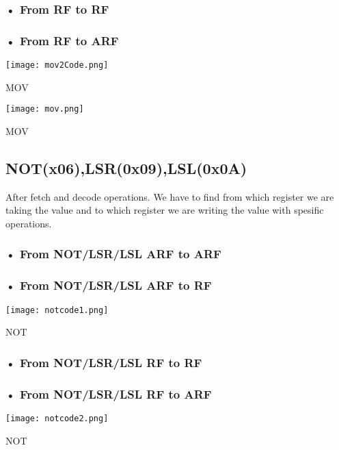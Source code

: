 \documentclass[pdftex,12pt,a4paper]{article}
\begin{document}
\subsubsection{• From RF to RF}
\subsubsection{• From RF to ARF}

\begin{figure21}
	\centering
	\texttt{[image: mov2Code.png]}	
	\caption{MOV}
	\label{fig1}
\end{figure21}

\begin{figure8}
	\centering
	\texttt{[image: mov.png]}	
	\caption{MOV}
	\label{fig1}
\end{figure8}


\subsection{NOT(x06),LSR(0x09),LSL(0x0A)}

After fetch and decode operations. We have to find from which register we are taking the value and to which register we are writing the value with spesific operations.

\subsubsection{• From NOT/LSR/LSL ARF to ARF}
\subsubsection{• From NOT/LSR/LSL ARF to RF}
\begin{figure61}
	\centering
	\texttt{[image: notcode1.png]}	
	\caption{NOT}
	\label{fig1}
\end{figure61}


\subsubsection{• From NOT/LSR/LSL RF to RF}
\subsubsection{• From NOT/LSR/LSL RF to ARF}


\begin{figure81}
	\centering
	\texttt{[image: notcode2.png]}	
	\caption{NOT}
	\label{fig1}
\end{figure81}
\end{document}
